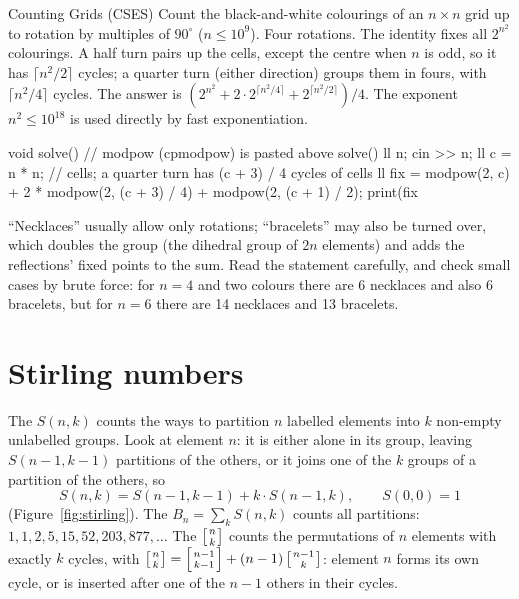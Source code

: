 \begin{problem}{Counting Grids (CSES)}
Count the black-and-white colourings of an $n \times n$ grid up to rotation by multiples of $90^\circ$ ($n \le 10^9$).
\solution Four rotations. The identity fixes all $2^{n^2}$ colourings. A half turn pairs up the cells, except the centre when $n$ is
odd, so it has $\lceil n^2/2 \rceil$ cycles; a quarter turn (either direction) groups them in fours, with $\lceil n^2/4 \rceil$ cycles.
The answer is $(2^{n^2} + 2 \cdot 2^{\lceil n^2/4 \rceil} + 2^{\lceil n^2/2 \rceil}) / 4$. The exponent $n^2 \le 10^{18}$ is used
directly by fast exponentiation.
\end{problem}

\begin{code}
void solve() {  // modpow (cpmodpow) is pasted above solve()
    ll n;
    cin >> n;
    ll c = n * n;  // cells; a quarter turn has (c + 3) / 4 cycles of cells
    ll fix = modpow(2, c) + 2 * modpow(2, (c + 3) / 4) + modpow(2, (c + 1) / 2);
    print(fix %
}
\end{code}

\begin{pitfall}
``Necklaces'' usually allow only rotations; ``bracelets'' may also be turned over, which doubles the group (the dihedral group of
$2n$ elements) and adds the reflections' fixed points to the sum. Read the statement carefully, and check small cases by brute force:
for $n = 4$ and two colours there are 6 necklaces and also 6 bracelets, but for $n = 6$ there are 14 necklaces and 13 bracelets.
\end{pitfall}

\section[Stirling numbers]{Stirling numbers \hfill \ioi}\label{sec:stirling}

The  $S(n, k)$ counts the ways to partition $n$ labelled elements into $k$ non-empty unlabelled
groups. Look at element $n$: it is either alone in its group, leaving $S(n - 1, k - 1)$ partitions of the others, or it joins one of the
$k$ groups of a partition of the others, so
\[
  S(n, k) = S(n - 1, k - 1) + k \cdot S(n - 1, k), \qquad S(0, 0) = 1
\]
(Figure~\ref{fig:stirling}). The  $B_n = \sum_k S(n, k)$ counts all partitions: $1, 1, 2, 5, 15, 52, 203, 877,
\dots$ The  $\left[{n \atop k}\right]$ counts the permutations of $n$ elements with exactly $k$
cycles, with $\left[{n \atop k}\right] = \left[{n-1 \atop k-1}\right] + (n - 1) \left[{n-1 \atop k}\right]$: element $n$ forms its own
cycle, or is inserted after one of the $n - 1$ others in their cycles.

